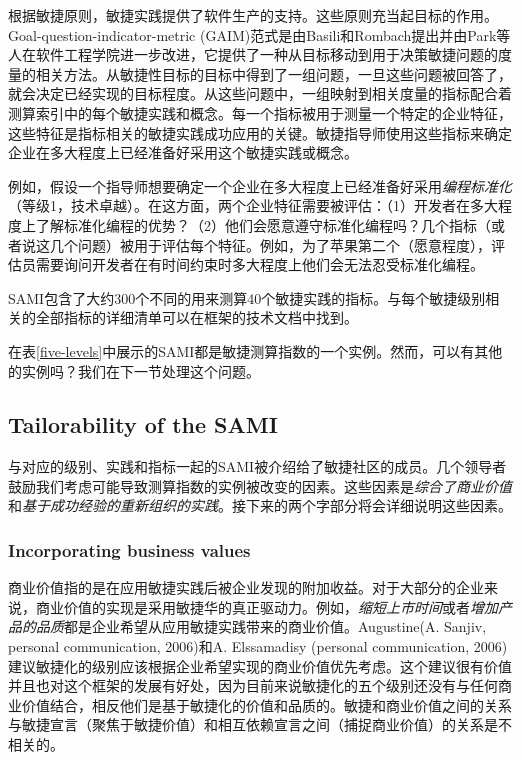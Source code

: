 \documentclass[twocolumn]{svjour3}[]
\begin{document}
根据敏捷原则，敏捷实践提供了软件生产的支持。这些原则充当起目标的作用。Goal-question-indicator-metric (GAIM)范式是由Basili和Rombach提出\cite{basili1992software}并由Park等人\cite{park1996goal}在软件工程学院进一步改进，它提供了一种从目标移动到用于决策敏捷问题的度量的相关方法。从敏捷性目标的目标中得到了一组问题，一旦这些问题被回答了，就会决定已经实现的目标程度。从这些问题中，一组映射到相关度量的指标配合着测算索引中的每个敏捷实践和概念。每一个指标被用于测量一个特定的企业特征，这些特征是指标相关的敏捷实践成功应用的关键。敏捷指导师使用这些指标来确定企业在多大程度上已经准备好采用这个敏捷实践或概念。

例如，假设一个指导师想要确定一个企业在多大程度上已经准备好采用\textit{编程标准化}（等级1，技术卓越）。在这方面，两个企业特征需要被评估：（1）开发者在多大程度上了解标准化编程的优势？（2）他们会愿意遵守标准化编程吗？几个指标（或者说这几个问题）被用于评估每个特征。例如，为了苹果第二个（愿意程度），评估员需要询问开发者在有时间约束时多大程度上他们会无法忍受标准化编程。

SAMI包含了大约300个不同的用来测算40个敏捷实践的指标。与每个敏捷级别相关的全部指标的详细清单可以在框架的技术文档中找到\cite{sidky2006agile}。

在表\ref{five-levels}中展示的SAMI都是敏捷测算指数的一个实例。然而，可以有其他的实例吗？我们在下一节处理这个问题。

\subsection{Tailorability of the SAMI}
\label{section2.5}

与对应的级别、实践和指标一起的SAMI被介绍给了敏捷社区的成员。几个领导者鼓励我们考虑可能导致测算指数的实例被改变的因素。这些因素是\textit{综合了商业价值}和\textit{基于成功经验的重新组织的实践}。接下来的两个字部分将会详细说明这些因素。

\subsubsection{Incorporating business values}

商业价值指的是在应用敏捷实践后被企业发现的附加收益。对于大部分的企业来说，商业价值的实现是采用敏捷华的真正驱动力。例如，\textit{缩短上市时间}或者\textit{增加产品的品质}都是企业希望从应用敏捷实践带来的商业价值。Augustine(A. Sanjiv, personal communication, 2006)和A. Elssamadisy (personal communication, 2006)建议敏捷化的级别应该根据企业希望实现的商业价值优先考虑。这个建议很有价值并且也对这个框架的发展有好处，因为目前来说敏捷化的五个级别还没有与任何商业价值结合，相反他们是基于敏捷化的价值和品质的。敏捷和商业价值之间的关系与敏捷宣言（聚焦于敏捷价值）和相互依赖宣言之间（捕捉商业价值）的关系是不相关的\cite{declaration2005pmdoim,agilemanifestoo2001agile}。
\end{document}
